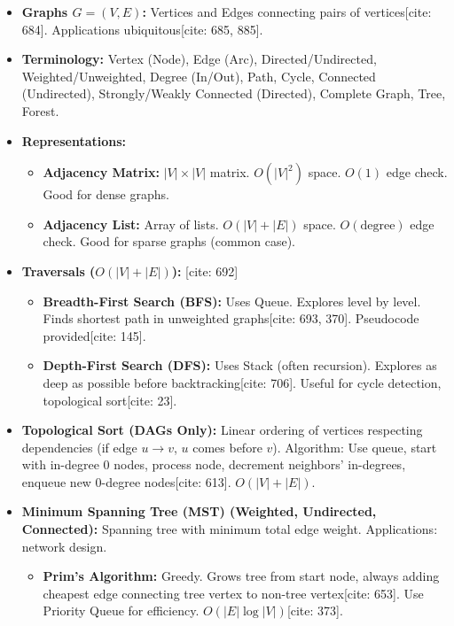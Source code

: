 \documentclass{article}
\begin{document}
\begin{itemize}
    \item \textbf{Graphs $G=(V, E)$:} Vertices and Edges connecting pairs of vertices[cite: 684]. Applications ubiquitous[cite: 685, 885].
    \item \textbf{Terminology:} Vertex (Node), Edge (Arc), Directed/Undirected, Weighted/Unweighted, Degree (In/Out), Path, Cycle, Connected (Undirected), Strongly/Weakly Connected (Directed), Complete Graph, Tree, Forest.
    \item \textbf{Representations:}
          \begin{itemize}
              \item \textbf{Adjacency Matrix:} $|V| \times |V|$ matrix. $O(|V|^2)$ space. $O(1)$ edge check. Good for dense graphs.
              \item \textbf{Adjacency List:} Array of lists. $O(|V|+|E|)$ space. $O(\text{degree})$ edge check. Good for sparse graphs (common case).
          \end{itemize}
    \item \textbf{Traversals ($O(|V|+|E|)$):} [cite: 692]
          \begin{itemize}
              \item \textbf{Breadth-First Search (BFS):} Uses Queue. Explores level by level. Finds shortest path in unweighted graphs[cite: 693, 370]. Pseudocode provided[cite: 145].
              \item \textbf{Depth-First Search (DFS):} Uses Stack (often recursion). Explores as deep as possible before backtracking[cite: 706]. Useful for cycle detection, topological sort[cite: 23].
          \end{itemize}
    \item \textbf{Topological Sort (DAGs Only):} Linear ordering of vertices respecting dependencies (if edge $u \to v$, $u$ comes before $v$). Algorithm: Use queue, start with in-degree 0 nodes, process node, decrement neighbors' in-degrees, enqueue new 0-degree nodes[cite: 613]. $O(|V|+|E|)$.
    \item \textbf{Minimum Spanning Tree (MST) (Weighted, Undirected, Connected):} Spanning tree with minimum total edge weight. Applications: network design.
          \begin{itemize}
              \item \textbf{Prim's Algorithm:} Greedy. Grows tree from start node, always adding cheapest edge connecting tree vertex to non-tree vertex[cite: 653]. Use Priority Queue for efficiency. $O(|E| \log |V|)$[cite: 373].

\end{itemize}
\end{itemize}
\end{document}
